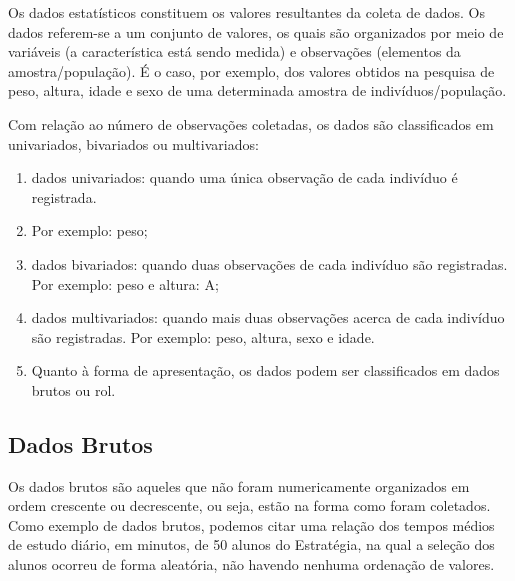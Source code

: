 Os dados estatísticos constituem os valores resultantes da coleta de dados. Os dados referem-se a um conjunto de valores, os quais são organizados por meio de variáveis (a característica está sendo medida) e observações (elementos da amostra/população). É o caso, por exemplo, dos valores obtidos na pesquisa de peso, altura, idade e sexo de uma determinada amostra de indivíduos/população.

Com relação ao número de observações coletadas, os dados são classificados em univariados, bivariados ou
multivariados:
\begin{enumerate}
    \item dados univariados: quando uma única observação de cada indivíduo é registrada.
    \item Por exemplo: peso;
    \item dados bivariados: quando duas observações de cada indivíduo são registradas. Por exemplo: peso e altura: A;
    \item dados multivariados: quando mais duas observações acerca de cada indivíduo são registradas. Por exemplo: peso, altura, sexo e idade.
    \item Quanto à forma de apresentação, os dados podem ser classificados em dados brutos ou rol.
\end{enumerate}
\subsection{Dados Brutos}

Os dados brutos são aqueles que não foram numericamente organizados em ordem crescente ou decrescente, ou seja, estão na forma como foram coletados. Como exemplo de dados brutos, podemos citar uma relação dos tempos médios de estudo diário, em minutos, de 50 alunos do Estratégia, na qual a seleção dos alunos ocorreu de forma aleatória, não havendo nenhuma ordenação de valores.

